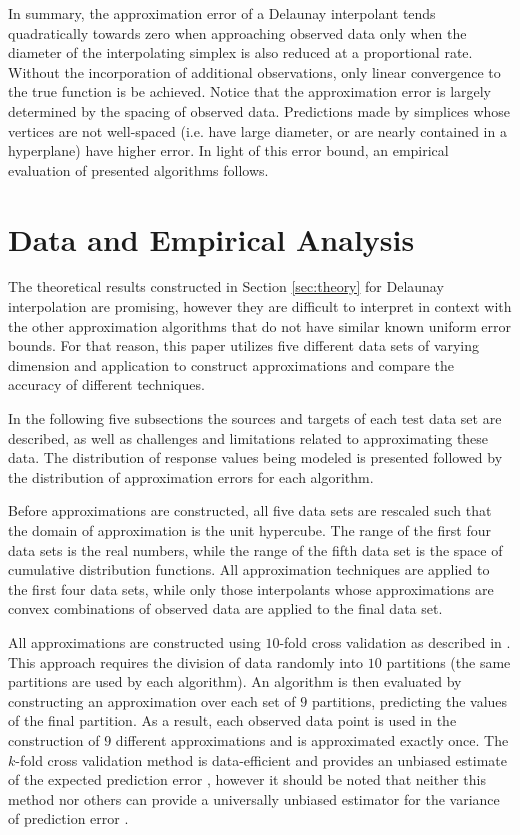 \documentclass[smallextended,final]{svjour3}       %
\begin{document}
In summary, the approximation error of a Delaunay interpolant tends quadratically towards zero when approaching observed data only when the diameter of the interpolating simplex is also reduced at a proportional rate. Without the incorporation of additional observations, only linear convergence to the true function is be achieved. Notice that the approximation error is largely determined by the spacing of observed data. Predictions made by simplices whose vertices are not well-spaced (i.e. have large diameter, or are nearly contained in a hyperplane) have higher error. In light of this error bound, an empirical evaluation of presented algorithms follows.

\section{Data and Empirical Analysis}
\label{sec:data}

The theoretical results constructed in Section \ref{sec:theory} for Delaunay interpolation are promising, however they are difficult to interpret in context with the other approximation algorithms that do not have similar known uniform error bounds. For that reason, this paper utilizes five different data sets of varying dimension and application to construct approximations and compare the accuracy of different techniques.

In the following five subsections the sources and targets of each test data set are described, as well as challenges and limitations related to approximating these data. The distribution of response values being modeled is presented followed by the distribution of approximation errors for each algorithm.

Before approximations are constructed, all five data sets are rescaled such that the domain of approximation is the unit hypercube. The range of the first four data sets is the real numbers, while the range of the fifth data set is the space of cumulative distribution functions. All approximation techniques are applied to the first four data sets, while only those interpolants whose approximations are convex combinations of observed data are applied to the final data set.

All approximations are constructed using $10$-fold cross validation as described in \cite{kohavi1995study}. This approach requires the division of data randomly into $10$ partitions (the same partitions are used by each algorithm). An algorithm is then evaluated by constructing an approximation over each set of $9$ partitions, predicting the values of the final partition. As a result, each observed data point is used in the construction of $9$ different approximations and is approximated exactly once. The $k$-fold cross validation method is data-efficient and provides an unbiased estimate of the expected prediction error \cite{kohavi1995study}, however it should be noted that neither this method nor others can provide a universally unbiased estimator for the variance of prediction error \cite{bengio2004no}.
\end{document}
